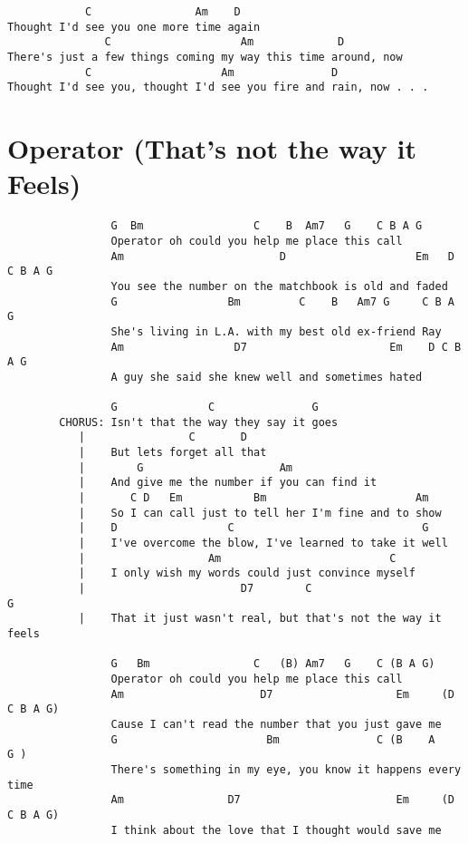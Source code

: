 \documentclass[leqno]{memoir}
\begin{document}
\begin{verbatim}
            C                Am    D
Thought I'd see you one more time again 
               C                    Am             D
There's just a few things coming my way this time around, now 
            C                    Am               D
Thought I'd see you, thought I'd see you fire and rain, now . . .
\end{verbatim}
\newpage

\chapter{Operator (That's not the way it Feels)}
\begin{verbatim}
                G  Bm                 C    B  Am7   G    C B A G
                Operator oh could you help me place this call
                Am                        D                    Em   D C B A G
                You see the number on the matchbook is old and faded
                G                 Bm         C    B   Am7 G     C B A G
                She's living in L.A. with my best old ex-friend Ray
                Am                 D7                      Em    D C B A G
                A guy she said she knew well and sometimes hated

                G              C               G
        CHORUS: Isn't that the way they say it goes
           |                C       D
           |    But lets forget all that
           |        G                     Am
           |    And give me the number if you can find it
           |       C D   Em           Bm                       Am
           |    So I can call just to tell her I'm fine and to show
           |    D                 C                             G
           |    I've overcome the blow, I've learned to take it well
           |                   Am                          C
           |    I only wish my words could just convince myself
           |                        D7        C                       G
           |    That it just wasn't real, but that's not the way it feels

                G   Bm                C   (B) Am7   G    C (B A G)
                Operator oh could you help me place this call
                Am                     D7                   Em     (D C B A G)
                Cause I can't read the number that you just gave me
                G                       Bm               C (B    A     G )
                There's something in my eye, you know it happens every time
                Am                D7                        Em     (D C B A G)
                I think about the love that I thought would save me


\end{verbatim}
\end{document}
